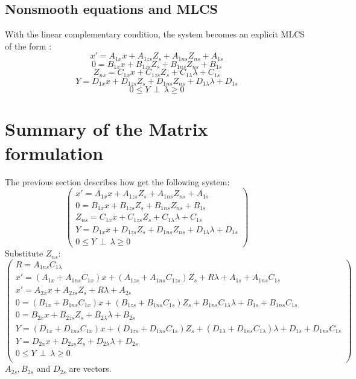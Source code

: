 \subsection{Nonsmooth equations and MLCS}
With the linear complementary condition, the system becomes an explicit MLCS of the form :
\[x' = A_{1x}x +A_{1zs}Z_{s} + A_{1ns}Z_{ns}+A_{1s}\]
\[0  = B_{1x}x+B_{1zs}Z_{s} + B_{1ns}Z_{ns}+B_{1s}\]
\[Z_{ns}= C_{1x}x+C_{1zs}Z_{s}+C_{1\lambda}\lambda +C_{1s}\]
\[Y=D_{1x}x +D_{1zs}Z_{s}+D_{1ns}Z_{ns}+D_{1\lambda}\lambda+D_{1s}\]
\[0 \leq Y \, \perp \, \lambda \geq 0\]

\newpage

\section{Summary of  the Matrix formulation}

The previous section describes how get the following system:
\[\left(\begin{array}{c}
x'=A_{1x}x +A_{1zs}Z_{s} + A_{1ns}Z_{ns}+A_{1s}\\
0=B_{1x}x+B_{1zs}Z_{s} + B_{1ns}Z_{ns}+B_{1s}\\
Z_{ns}= C_{1x}x+C_{1zs}Z_{s}+C_{1\lambda}\lambda +C_{1s}\\
Y=D_{1x}x +D_{1zs}Z_{s}+D_{1ns}Z_{ns}+D_{1\lambda}\lambda+D_{1s}\\
0 \leq Y \, \perp \, \lambda \geq 0
\end{array}\right)\]
Substitute $Z_{ns}$:
\[\left(\begin{array}{c}
R=A_{1ns}C_{1\lambda}\\
x'=(A_{1x}+A_{1ns}C_{1x})x +(A_{1zs}+A_{1ns}C_{1zs})Z_{s} +R\lambda+A_{1s} + A_{1ns}C_{1s}\\
x'=A_{2x}x +A_{2zs}Z_{s} +R \lambda +A_{2s}\\
0=(B_{1x}+B_{1ns}C_{1x})x+(B_{1zs}+B_{1ns}C_{1s})Z_{s} + B_{1ns}C_{1\lambda}\lambda +B_{1s} + B_{1ns}C_{1s} \\
0=B_{2x}x+B_{2zs}Z_{s} + B_{2\lambda}\lambda + B_{2s}\\
Y=(D_{1x}+D_{1ns}C_{1x})x+(D_{1zs}+D_{1ns}C_{1s})Z_{s}+(D_{1\lambda}+D_{1ns}C_{1\lambda})\lambda +D_{1s}+D_{1ns}C_{1s}\\
Y=D_{2x}x+D_{2zs}Z_{s}+D_{2\lambda}\lambda + D_{2s} \\
0 \leq Y \, \perp \, \lambda \geq 0\\
\end{array}\right)\]
$A_{2s}, B_{2s}$ and $D_{2s}$ are vectors.



